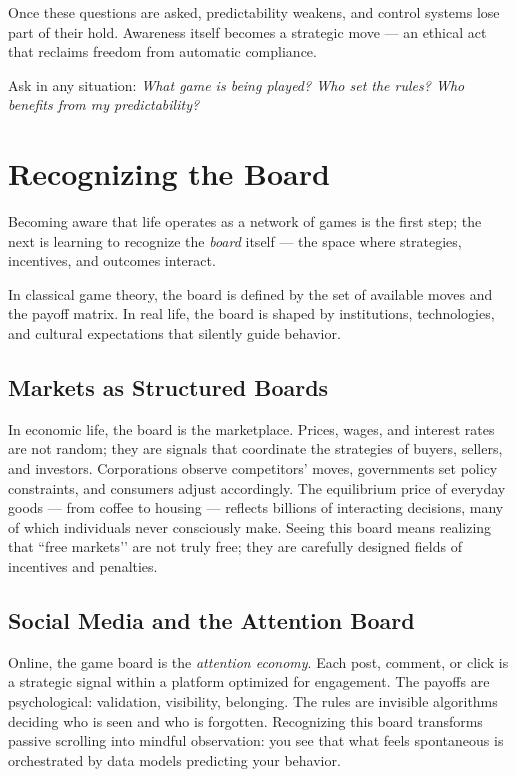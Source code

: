 \documentclass[12pt,twoside]{book}
\begin{document}
Once these questions are asked, predictability weakens, and control systems lose part of their hold.  
Awareness itself becomes a strategic move --- an ethical act that reclaims freedom from automatic compliance.\\

\begin{keyidea}
Ask in any situation: \emph{What game is being played? Who set the rules? Who benefits from my predictability?}
\end{keyidea}

\section{Recognizing the Board}

Becoming aware that life operates as a network of games is the first step; the next is learning to recognize the \emph{board} itself --- the space where strategies, incentives, and outcomes interact.

In classical game theory, the board is defined by the set of available moves and the payoff matrix.  
In real life, the board is shaped by institutions, technologies, and cultural expectations that silently guide behavior.

\subsection*{Markets as Structured Boards}
In economic life, the board is the marketplace.  
Prices, wages, and interest rates are not random; they are signals that coordinate the strategies of buyers, sellers, and investors.  
Corporations observe competitors’ moves, governments set policy constraints, and consumers adjust accordingly.  
The equilibrium price of everyday goods --- from coffee to housing --- reflects billions of interacting decisions, many of which individuals never consciously make.  
Seeing this board means realizing that ``free markets’’ are not truly free; they are carefully designed fields of incentives and penalties.

\subsection*{Social Media and the Attention Board}
Online, the game board is the \emph{attention economy}.  
Each post, comment, or click is a strategic signal within a platform optimized for engagement.  
The payoffs are psychological: validation, visibility, belonging.  
The rules are invisible algorithms deciding who is seen and who is forgotten.  
Recognizing this board transforms passive scrolling into mindful observation: you see that what feels spontaneous is orchestrated by data models predicting your behavior.
\end{document}
